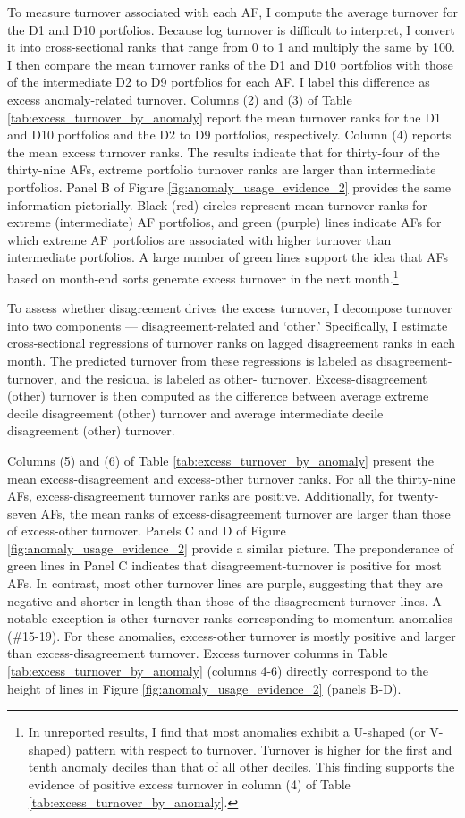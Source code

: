 \documentclass[
  12pt,
  a4paper,
  twoside,
  onecolumn]{article}
\begin{document}
To measure turnover associated with each AF, I compute the average
turnover for the D1 and D10 portfolios. Because log turnover is
difficult to interpret, I convert it into cross-sectional ranks that
range from 0 to 1 and multiply the same by 100. I then compare the mean
turnover ranks of the D1 and D10 portfolios with those of the
intermediate D2 to D9 portfolios for each AF. I label this difference as
excess anomaly-related turnover. Columns (2) and (3) of Table
\ref{tab:excess_turnover_by_anomaly} report the mean turnover ranks for
the D1 and D10 portfolios and the D2 to D9 portfolios, respectively.
Column (4) reports the mean excess turnover ranks. The results indicate
that for thirty-four of the thirty-nine AFs, extreme portfolio turnover
ranks are larger than intermediate portfolios. Panel B of Figure
\ref{fig:anomaly_usage_evidence_2} provides the same information
pictorially. Black (red) circles represent mean turnover ranks for
extreme (intermediate) AF portfolios, and green (purple) lines indicate
AFs for which extreme AF portfolios are associated with higher turnover
than intermediate portfolios. A large number of green lines support the
idea that AFs based on month-end sorts generate excess turnover in the
next month.\footnote{In unreported results, I find that most anomalies
  exhibit a U-shaped (or V-shaped) pattern with respect to turnover.
  Turnover is higher for the first and tenth anomaly deciles than that
  of all other deciles. This finding supports the evidence of positive
  excess turnover in column (4) of Table
  \ref{tab:excess_turnover_by_anomaly}.}

To assess whether disagreement drives the excess turnover, I decompose
turnover into two components --- disagreement-related and `other.'
Specifically, I estimate cross-sectional regressions of turnover ranks
on lagged disagreement ranks in each month. The predicted turnover from
these regressions is labeled as disagreement- turnover, and the residual
is labeled as other- turnover. Excess-disagreement (other) turnover is
then computed as the difference between average extreme decile
disagreement (other) turnover and average intermediate decile
disagreement (other) turnover.

Columns (5) and (6) of Table \ref{tab:excess_turnover_by_anomaly}
present the mean excess-disagreement and excess-other turnover ranks.
For all the thirty-nine AFs, excess-disagreement turnover ranks are
positive. Additionally, for twenty-seven AFs, the mean ranks of
excess-disagreement turnover are larger than those of excess-other
turnover. Panels C and D of Figure \ref{fig:anomaly_usage_evidence_2}
provide a similar picture. The preponderance of green lines in Panel C
indicates that disagreement-turnover is positive for most AFs. In
contrast, most other turnover lines are purple, suggesting that they are
negative and shorter in length than those of the disagreement-turnover
lines. A notable exception is other turnover ranks corresponding to
momentum anomalies (\#15-19). For these anomalies, excess-other turnover
is mostly positive and larger than excess-disagreement turnover. Excess
turnover columns in Table \ref{tab:excess_turnover_by_anomaly} (columns
4-6) directly correspond to the height of lines in Figure
\ref{fig:anomaly_usage_evidence_2} (panels B-D).
\end{document}
